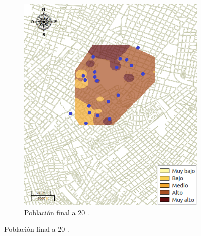 \begin{figure}[!t]
\begin{subfigure}[b]{0.225\textwidth}
        \includegraphics[width=\textwidth]{./graphics/temp-20-final.png}
        \caption{ Población final a 20 \textcelsius.}
    \end{subfigure}


\end{figure}
